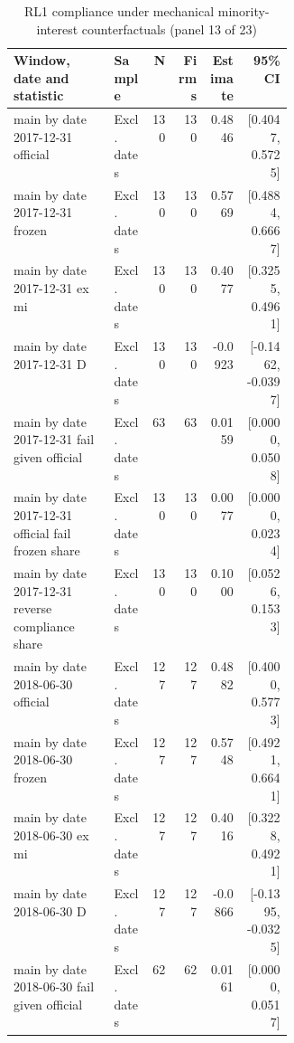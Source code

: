 \begin{table}[!htbp]\centering\scriptsize
\caption{RL1 compliance under mechanical minority-interest counterfactuals (panel 13 of 23)}
\begin{threeparttable}
\begin{tabular}{p{0.36\linewidth}lrrrr}
\toprule
Window, date and statistic & Sample & N & Firms & Estimate & 95\% CI \\
\midrule
main by date 2017-12-31 official & Excl. dates & 130 & 130 & 0.4846 & [0.4047, 0.5725] \\
main by date 2017-12-31 frozen & Excl. dates & 130 & 130 & 0.5769 & [0.4884, 0.6667] \\
main by date 2017-12-31 ex mi & Excl. dates & 130 & 130 & 0.4077 & [0.3255, 0.4961] \\
main by date 2017-12-31 D & Excl. dates & 130 & 130 & -0.0923 & [-0.1462, -0.0397] \\
main by date 2017-12-31 fail given official & Excl. dates & 63 & 63 & 0.0159 & [0.0000, 0.0508] \\
main by date 2017-12-31 official fail frozen share & Excl. dates & 130 & 130 & 0.0077 & [0.0000, 0.0234] \\
main by date 2017-12-31 reverse compliance share & Excl. dates & 130 & 130 & 0.1000 & [0.0526, 0.1533] \\
main by date 2018-06-30 official & Excl. dates & 127 & 127 & 0.4882 & [0.4000, 0.5773] \\
main by date 2018-06-30 frozen & Excl. dates & 127 & 127 & 0.5748 & [0.4921, 0.6641] \\
main by date 2018-06-30 ex mi & Excl. dates & 127 & 127 & 0.4016 & [0.3228, 0.4921] \\
main by date 2018-06-30 D & Excl. dates & 127 & 127 & -0.0866 & [-0.1395, -0.0325] \\
main by date 2018-06-30 fail given official & Excl. dates & 62 & 62 & 0.0161 & [0.0000, 0.0517] \\
\bottomrule
\end{tabular}
\begin{tablenotes}[flushleft]\footnotesize

\end{tablenotes}
\end{threeparttable}
\end{table}
